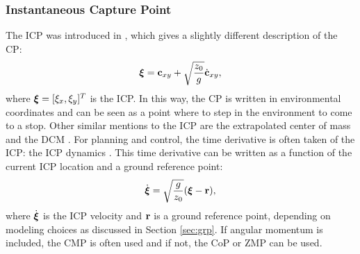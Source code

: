 \subsubsection{Instantaneous Capture Point} 
The \ac{ICP} was introduced in \cite{koolen2012capturability}, which gives a slightly different description of the \ac{CP}:
\begin{equation}
\boldsymbol{\xi}=\mathbf{c}_{xy}+\sqrt{\frac{z_0}{g}}\dot{\mathbf{c}}_{xy},
\label{eq:icp}
\end{equation}
where $\boldsymbol{\xi}=[\xi_x, \xi_y]^T$ is the \ac{ICP}. In this way, the \ac{CP} is written in environmental coordinates and can be seen as a point where to step in the environment to come to a stop. Other similar mentions to the \ac{ICP} are the extrapolated center of mass \cite{hof2008extrapolated} and the \ac{DCM} \cite{takenaka2009real}. 
\paraskip
For planning and control, the time derivative is often taken of the \ac{ICP}: the \ac{ICP} dynamics \cite{koolen2012capturability}. This time derivative can be written as a function of the current \ac{ICP} location and a ground reference point:
\begin{equation}\label{eq:icpdyn}
\dot{\boldsymbol{\xi}}=\sqrt{ \frac{g}{z_0}}(\boldsymbol{\xi}-\mathbf{r}),
\end{equation}
where $\dot{\boldsymbol{\xi}}$ is the \ac{ICP} velocity and $\mathbf{r}$ is a ground reference point, depending on modeling choices as discussed in Section \ref{sec:grp}. If angular momentum is included, the \ac{CMP} is often used and if not, the \ac{CoP} or \ac{ZMP} can be used.


